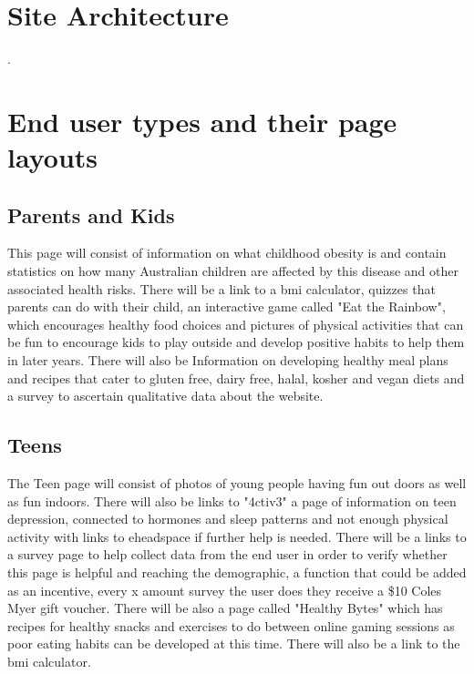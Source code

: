 \documentclass[letterpaper,12pt]{article}
\begin{document}
\section{Site Architecture}

.


\section{End user types and their page layouts}
\subsection{Parents and Kids}

This page will consist of information on what childhood obesity is and contain statistics on how many Australian children are affected by this disease and other associated health risks. There will be a link to a \acrfull{bmi} calculator, quizzes that parents can do with their child, an interactive game called "Eat the Rainbow", which encourages healthy food choices and pictures of physical activities that can be fun to encourage kids to play outside and develop positive habits to help them in later years. There will also be Information on developing healthy meal plans and recipes that cater to gluten free, dairy free, halal, kosher and vegan diets and a survey to ascertain qualitative data about the website.

\subsection{Teens}

The Teen page will consist of photos of young people having fun out doors as well as fun indoors. There will also be links to "4ctiv3" a page of information on teen depression, connected to hormones and sleep patterns and not enough physical activity with links to eheadspace if further help is needed. There will be a links to a survey page to help collect data from the end user in order to verify whether this page is helpful and reaching the demographic, a function that could be added as an incentive, every x amount survey the user does they receive a \$10 Coles Myer gift voucher. There will be also a page called "Healthy Bytes" which has recipes for healthy snacks and exercises to do between online gaming sessions as poor eating habits can be developed at this time. There will also be a link to the \acrshort{bmi} calculator.
\end{document}
